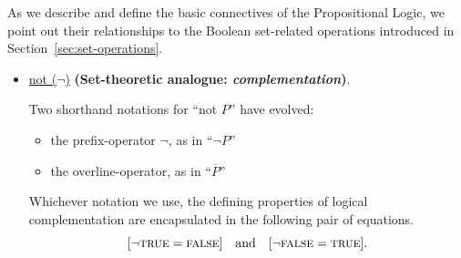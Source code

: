 \noindent
As we describe and define the basic connectives of the Propositional
Logic, we point out their relationships to the Boolean set-related
operations introduced in Section~\ref{sec:set-operations}.

\medskip

\begin{itemize}
\item
\underline{{\sc not} ($\neg$)}
{\bf (Set-theoretic analogue: {\em complementation})}.


Two shorthand notations for ``{\sc not} $P$'' have evolved:
  \begin{itemize}
  \item
the prefix-operator $\neg$, as in ``$\neg P$''
  \item
the overline-operator, as in ``$\overline{P}$''
  \end{itemize}
Whichever notation we use, the defining properties of logical
complementation are encapsulated in the following pair of equations.
\[
[\neg \mbox{\sc true} = \mbox{\sc false}] \ \ \mbox{ and } \ \ [\neg
  \mbox{\sc false} = \mbox{\sc true}].
\]
\end{itemize}

\medskip


